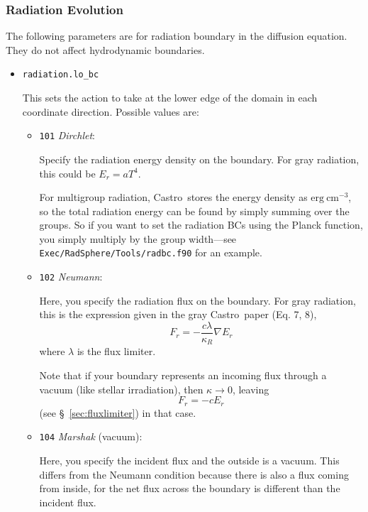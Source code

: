 \documentclass[11pt,letterpaper]{article}
\newcommand{\castro}{{\sf Castro}}
\begin{document}
\subsubsection{Radiation Evolution}

The following parameters are for radiation boundary in the diffusion
equation. They do not affect hydrodynamic boundaries.
\begin{itemize}
\item {\tt radiation.lo\_bc}
  
  This sets the action to take at the lower edge of the domain in
  each coordinate direction.  Possible values are:
  \begin{itemize}

  \item {\tt 101} {\em Dirchlet}:

    Specify the radiation energy density on the boundary.
    For gray radiation, this could be $E_r = a T^4$.

    For multigroup radiation,  \castro\ stores the energy density as
    $\mathrm{erg}~\mathrm{cm}^{-3}$, so the total radiation energy
    can be found by simply summing over the groups.  So if you want
    to set the radiation BCs using the Planck function, you simply
    multiply by the group width---see {\tt Exec/RadSphere/Tools/radbc.f90}
    for an example.

  \item {\tt 102} {\em Neumann}:

    Here, you specify the radiation flux on the boundary.  For gray
    radiation, this is the expression given in the gray \castro\ paper
    (Eq. 7, 8),
    \begin{equation}
      F_r = - \frac{c\lambda}{\kappa_R} \nabla E_r
    \end{equation}
    where $\lambda$ is the flux limiter.

    Note that if your boundary represents an incoming flux through
    a vacuum (like stellar irradiation), then $\kappa \rightarrow 0$, leaving
    \begin{equation}
      F_r = -c E_r
    \end{equation}
    (see \S~\ref{sec:fluxlimiter}) in that case.  

  \item {\tt 104} {\em Marshak} (vacuum):
      
    Here, you specify the incident flux and the outside is a vacuum.
    This differs from the Neumann condition because there is also a
    flux coming from inside, for the net flux across the boundary is
    different than the incident flux.


\end{itemize}
\end{itemize}
\end{document}

